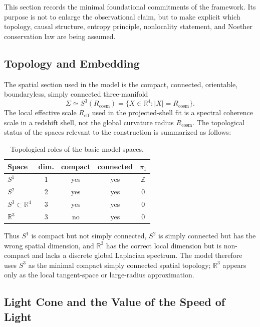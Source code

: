 \documentclass[
  aps,
  prd,
  reprint,
  superscriptaddress,
  nofootinbib,
  longbibliography,
  floatfix,
  amsmath,
  amssymb
]{revtex4-2}
\theoremstyle{plain}
\theoremstyle{definition}
\theoremstyle{remark}
\newcommand{\Reff}{R_{\mathrm{eff}}}
\newcommand{\Rcosm}{R_{\mathrm{cosm}}}
\begin{document}
This section records the minimal foundational commitments of the
framework. Its purpose is not to enlarge the observational claim, but to
make explicit which topology, causal structure, entropy principle,
nonlocality statement, and Noether conservation law are being assumed.

\subsection{Topology and Embedding}

The spatial section used in the model is the compact, connected,
orientable, boundaryless, simply connected three-manifold
\begin{equation}
  \Sigma \simeq S^3(\Rcosm) = \{X\in\mathbb R^4: |X|=\Rcosm\}.
\end{equation}
The local effective scale \(\Reff\) used in the projected-shell fit is a
spectral coherence scale in a redshift shell, not the global curvature
radius \(\Rcosm\). The topological status of the spaces relevant to the
construction is summarized as follows:
\begin{table}[t]
\centering
\caption{Topological roles of the basic model spaces.}
\label{tab:topology-foundations}
\begin{ruledtabular}
\begin{tabular}{lcccc}
Space & dim. & compact & connected & $\pi_1$ \\
\hline
$S^1$ & 1 & yes & yes & $\mathbb Z$ \\
$S^2$ & 2 & yes & yes & $0$ \\
$S^3\subset\mathbb R^4$ & 3 & yes & yes & $0$ \\
$\mathbb R^3$ & 3 & no & yes & $0$ \\
\end{tabular}
\end{ruledtabular}
\end{table}
Thus \(S^1\) is compact but not simply connected, \(S^2\) is simply
connected but has the wrong spatial dimension, and \(\mathbb R^3\) has
the correct local dimension but is non-compact and lacks a discrete
global Laplacian spectrum. The model therefore uses \(S^3\) as the
minimal compact simply connected spatial topology; \(\mathbb R^3\)
appears only as the local tangent-space or large-radius approximation.

\subsection{Light Cone and the Value of the Speed of Light}
\end{document}
